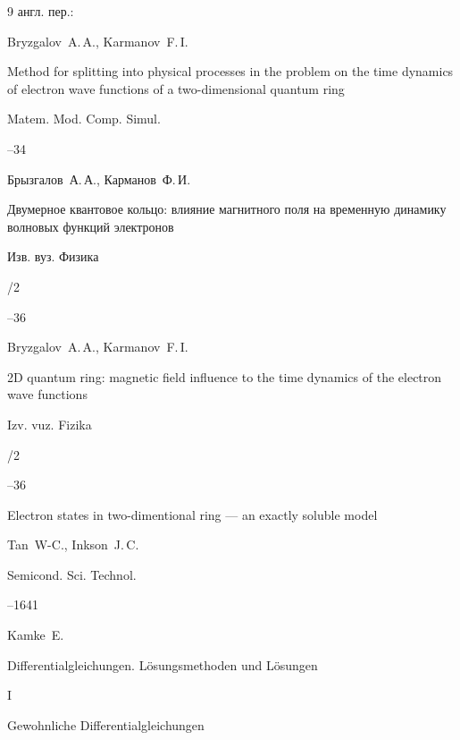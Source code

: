\begin{thebibliography}{9}
\transl англ. пер.:~

\by Bryzgalov~A.\,A., Karmanov~F.\,I.

\paper Method for splitting into physical processes in the problem on the time dynamics of electron wave functions of a two-dimensional quantum ring 

\jour Matem. Mod. Comp. Simul.




--34






\by Брызгалов~А.\,А., Карманов~Ф.\,И.

\paper Двумерное квантовое кольцо: влияние магнитного поля на временную динамику волновых функций электронов 

\jour Изв. вуз. Физика


/2

--36

\misctransl

\by Bryzgalov~A.\,A., Karmanov~F.\,I.

\paper 2D quantum ring: magnetic field influence to the time dynamics of the  electron wave functions

\jour Izv. vuz. Fizika


/2

--36




\paper Electron states in two-dimentional ring --- an exactly soluble model 

\by Tan~W-C., Inkson~J.\,C. 

\jour Semicond. Sci. Technol.




--1641




\by Kamke~E.

\book Differentialgleichungen. L\"osungsmethoden und L\"osungen

\bookvol I

\volinfo Gewohnliche Differentialgleichungen


\end{thebibliography}
